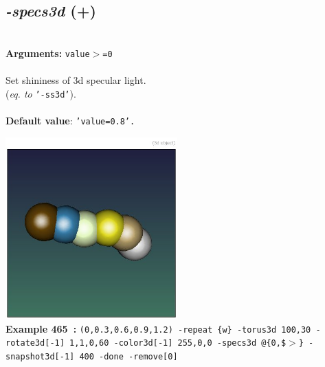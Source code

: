\documentclass[a4paper,11pt,twoside]{book}
\begin{document}
\subsection{\emph{-specs3d} (+)}\vspace*{-0.5em}
~\\\textbf{Arguments: } 
{\small \texttt{value$>$=0}}\\~\\
Set shininess of 3d specular light.
~\\(\emph{eq. to} {\small \texttt{'-ss3d'}}).
~\\~\\\textbf{Default value}: {\small \texttt{'value=0.8'.}}
\begin{center}\includegraphics[keepaspectratio=true,height=7cm,width=\textwidth]{img/gmic_def465.jpg}\\
{\footnotesize \textbf{Example 465~:} \texttt{(0,0.3,0.6,0.9,1.2) -repeat \{w\} -torus3d 100,30 -rotate3d[-1] 1,1,0,60 -color3d[-1] 255,0,0 -specs3d @\{0,\$$>$\} -snapshot3d[-1] 400 -done -remove[0]}}
\end{center}
\end{document}
